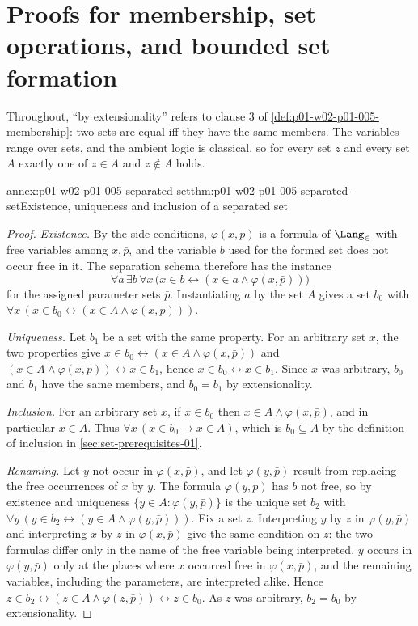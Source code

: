 \section{Proofs for membership, set operations, and bounded set formation}
\label{sec:annex-p01-w02-p01-005-set-operations}

Throughout, ``by extensionality'' refers to clause 3 of
\cref{def:p01-w02-p01-005-membership}: two sets are equal iff they have the
same members. The variables range over sets, and the ambient logic is
classical, so for every set \(z\) and every set \(A\) exactly one of
\(z\in A\) and \(z\notin A\) holds.

\begin{annexitem}{annex:p01-w02-p01-005-separated-set}{thm:p01-w02-p01-005-separated-set}{Existence, uniqueness and inclusion of a separated set}
\begin{proof}
\emph{Existence.} By the side conditions, \(\varphi(x,\bar p)\) is a formula of
\(\Lang_{\in}\) with free variables among \(x,\bar p\), and the variable \(b\)
used for the formed set does not occur free in it. The separation schema
therefore has the instance
\[
  \forall a\,\exists b\,\forall x\,
  \bigl(x\in b\leftrightarrow(x\in a\land\varphi(x,\bar p))\bigr)
\]
for the assigned parameter sets \(\bar p\). Instantiating \(a\) by the set
\(A\) gives a set \(b_0\) with
\(\forall x\,(x\in b_0\leftrightarrow(x\in A\land\varphi(x,\bar p)))\).

\emph{Uniqueness.} Let \(b_1\) be a set with the same property. For an
arbitrary set \(x\), the two properties give
\(x\in b_0\leftrightarrow(x\in A\land\varphi(x,\bar p))\) and
\((x\in A\land\varphi(x,\bar p))\leftrightarrow x\in b_1\), hence
\(x\in b_0\leftrightarrow x\in b_1\). Since \(x\) was arbitrary,
\(b_0\) and \(b_1\) have the same members, and \(b_0=b_1\) by extensionality.

\emph{Inclusion.} For an arbitrary set \(x\), if \(x\in b_0\) then
\(x\in A\land\varphi(x,\bar p)\), and in particular \(x\in A\). Thus
\(\forall x\,(x\in b_0\to x\in A)\), which is \(b_0\subseteq A\) by the
definition of inclusion in \cref{sec:set-prerequisites-01}.

\emph{Renaming.} Let \(y\) not occur in \(\varphi(x,\bar p)\), and let
\(\varphi(y,\bar p)\) result from replacing the free occurrences of \(x\) by
\(y\). The formula \(\varphi(y,\bar p)\) has \(b\) not free, so by existence
and uniqueness \(\{y\in A:\varphi(y,\bar p)\}\) is the unique set \(b_2\) with
\(\forall y\,(y\in b_2\leftrightarrow(y\in A\land\varphi(y,\bar p)))\). Fix
a set \(z\). Interpreting \(y\) by \(z\) in \(\varphi(y,\bar p)\) and
interpreting \(x\) by \(z\) in \(\varphi(x,\bar p)\) give the same condition on
\(z\): the two formulas differ only in the name of the free variable being
interpreted, \(y\) occurs in \(\varphi(y,\bar p)\) only at the places where
\(x\) occurred free in \(\varphi(x,\bar p)\), and the remaining variables,
including the parameters, are interpreted alike. Hence
\(z\in b_2\leftrightarrow(z\in A\land\varphi(z,\bar p))
\leftrightarrow z\in b_0\). As \(z\) was arbitrary, \(b_2=b_0\) by
extensionality.
\end{proof}
\end{annexitem}

